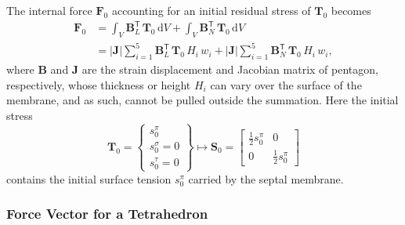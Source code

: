 The internal force $\boldsymbol{F}_0$ accounting for an initial residual stress of $\boldsymbol{T}_0$ becomes
\begin{equation}
	\begin{aligned}
		\boldsymbol{F}_0 &= \int_V \mathbf{B}_L^{\mathsf{T}} \,	\boldsymbol{T}_0 \, 
		\mathrm{d}V + 	\int_V \mathbf{B}_N^{\mathsf{T}} \,	\boldsymbol{T}_0 \, \mathrm{d}V \\
		& =  | \mathbf{J} | \sum_{i=1}^{5} \mathbf{B}_L^{\mathsf{T}} \,	\boldsymbol{T}_0 \, H_i \, w_i + | \mathbf{J} | \sum_{i=1}^{5} \mathbf{B}_N^{\mathsf{T}} \, \boldsymbol{T}_0 \, H_i \, w_i ,
	\end{aligned}
\end{equation}
where $\mathbf{B}$ and $\mathbf{J}$ are the strain displacement and Jacobian matrix of pentagon, respectively, whose thickness or height $H_i$ can vary over the surface of the membrane, and as such, cannot be pulled outside the summation. Here the initial stress
\begin{equation} 
    \mathbf{T}_0 = \left\{ \begin{matrix} 
        s^{\pi}_0 \\ s^{\sigma}_0 \! = \! 0 \\ s^{\tau}_0 \! = \! 0
    \end{matrix} \right\} \mapsto 
    \mathbf{S}_0 = \begin{bmatrix}
    \tfrac{1}{2} s^{\pi}_0 & 0 \\
    0 & \tfrac{1}{2} s^{\pi}_0
    \end{bmatrix}
\end{equation}
contains the initial surface tension $s^{\pi}_0$ carried by the septal membrane.

\subsubsection{Force Vector for a Tetrahedron}

